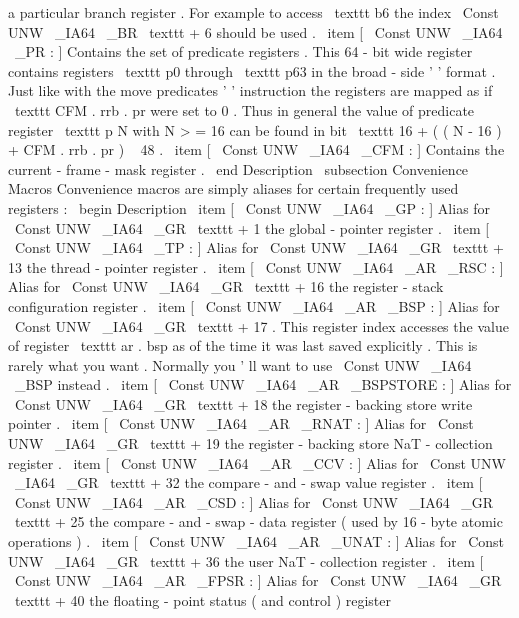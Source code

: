 a
particular
branch
register
.
For
example
to
access
\
texttt
{
b6
}
the
index
\
Const
{
UNW
\
_IA64
\
_BR
}
\
texttt
{
+
6
}
should
be
used
.
\
item
[
\
Const
{
UNW
\
_IA64
\
_PR
}
:
]
Contains
the
set
of
predicate
registers
.
This
64
-
bit
wide
register
contains
registers
\
texttt
{
p0
}
through
\
texttt
{
p63
}
in
the
broad
-
side
'
'
format
.
Just
like
with
the
move
predicates
'
'
instruction
the
registers
are
mapped
as
if
\
texttt
{
CFM
.
rrb
.
pr
}
were
set
to
0
.
Thus
in
general
the
value
of
predicate
register
\
texttt
{
p
}
N
with
N
>
=
16
can
be
found
in
bit
\
texttt
{
16
+
(
(
N
-
16
)
+
CFM
.
rrb
.
pr
)
\
%
48
}
.
\
item
[
\
Const
{
UNW
\
_IA64
\
_CFM
}
:
]
Contains
the
current
-
frame
-
mask
register
.
\
end
{
Description
}
\
subsection
{
Convenience
Macros
}
Convenience
macros
are
simply
aliases
for
certain
frequently
used
registers
:
\
begin
{
Description
}
\
item
[
\
Const
{
UNW
\
_IA64
\
_GP
}
:
]
Alias
for
\
Const
{
UNW
\
_IA64
\
_GR
}
\
texttt
{
+
1
}
the
global
-
pointer
register
.
\
item
[
\
Const
{
UNW
\
_IA64
\
_TP
}
:
]
Alias
for
\
Const
{
UNW
\
_IA64
\
_GR
}
\
texttt
{
+
13
}
the
thread
-
pointer
register
.
\
item
[
\
Const
{
UNW
\
_IA64
\
_AR
\
_RSC
}
:
]
Alias
for
\
Const
{
UNW
\
_IA64
\
_GR
}
\
texttt
{
+
16
}
the
register
-
stack
configuration
register
.
\
item
[
\
Const
{
UNW
\
_IA64
\
_AR
\
_BSP
}
:
]
Alias
for
\
Const
{
UNW
\
_IA64
\
_GR
}
\
texttt
{
+
17
}
.
This
register
index
accesses
the
value
of
register
\
texttt
{
ar
.
bsp
}
as
of
the
time
it
was
last
saved
explicitly
.
This
is
rarely
what
you
want
.
Normally
you
'
ll
want
to
use
\
Const
{
UNW
\
_IA64
\
_BSP
}
instead
.
\
item
[
\
Const
{
UNW
\
_IA64
\
_AR
\
_BSPSTORE
}
:
]
Alias
for
\
Const
{
UNW
\
_IA64
\
_GR
}
\
texttt
{
+
18
}
the
register
-
backing
store
write
pointer
.
\
item
[
\
Const
{
UNW
\
_IA64
\
_AR
\
_RNAT
}
:
]
Alias
for
\
Const
{
UNW
\
_IA64
\
_GR
}
\
texttt
{
+
19
}
the
register
-
backing
store
NaT
-
collection
register
.
\
item
[
\
Const
{
UNW
\
_IA64
\
_AR
\
_CCV
}
:
]
Alias
for
\
Const
{
UNW
\
_IA64
\
_GR
}
\
texttt
{
+
32
}
the
compare
-
and
-
swap
value
register
.
\
item
[
\
Const
{
UNW
\
_IA64
\
_AR
\
_CSD
}
:
]
Alias
for
\
Const
{
UNW
\
_IA64
\
_GR
}
\
texttt
{
+
25
}
the
compare
-
and
-
swap
-
data
register
(
used
by
16
-
byte
atomic
operations
)
.
\
item
[
\
Const
{
UNW
\
_IA64
\
_AR
\
_UNAT
}
:
]
Alias
for
\
Const
{
UNW
\
_IA64
\
_GR
}
\
texttt
{
+
36
}
the
user
NaT
-
collection
register
.
\
item
[
\
Const
{
UNW
\
_IA64
\
_AR
\
_FPSR
}
:
]
Alias
for
\
Const
{
UNW
\
_IA64
\
_GR
}
\
texttt
{
+
40
}
the
floating
-
point
status
(
and
control
)
register
